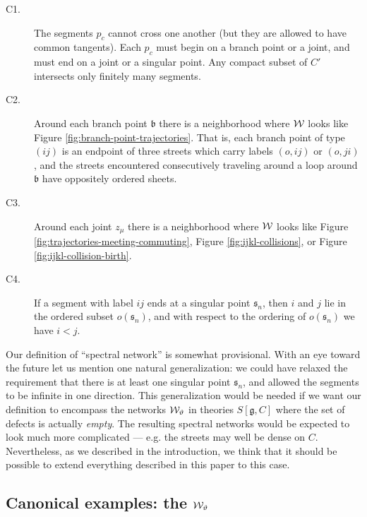 \documentclass[11pt,a4paper]{article}
\def\fg{\mathfrak{g}}
\def\wnet {{\cal W}}
\newcommand{\ti}[1]{\textit{#1}}
\def\fb{\mathfrak{b}}
\def\fg{\mathfrak{g}}
\def\fs{\mathfrak{s}}
\def\wnet {{\cal W}}
\begin{document}
\begin{description}

\item[C1.] The segments $p_c$ cannot cross one another (but they are allowed to
have common tangents).  Each $p_c$ must begin on a branch point or a joint,
and must end on a joint or a singular point.  Any compact subset of $C'$
intersects only finitely many segments.

\item[C2.] Around each branch point $\fb$ there is a neighborhood where $\wnet$
looks like Figure \ref{fig:branch-point-trajectories}.  That is,
each branch point of type $(ij)$ is an endpoint of three
streets which carry labels $(o,ij)$ or $(o,ji)$, and
the streets encountered consecutively traveling around a loop around $\fb$
have oppositely ordered sheets.

\item[C3.] Around each joint $z_\mu$ there is a neighborhood where
$\wnet$ looks like Figure \ref{fig:trajectories-meeting-commuting},
Figure \ref{fig:ijkl-collisions}, or Figure \ref{fig:ijkl-collision-birth}.

\item[C4.] If a segment with label $ij$ ends at a singular point $\mathfrak{s}_n$,
then $i$ and $j$ lie in the ordered subset $o(\mathfrak{s}_n)$,
and with respect to the ordering of $o(\mathfrak{s}_n)$ we have $i < j$.

\end{description}

Our definition of ``spectral network'' is somewhat provisional.
With an eye toward the future let us mention one natural
generalization:  we could have relaxed the requirement that there is at least
one singular point $\fs_n$, and allowed
the segments to be infinite in one direction.  This generalization would be needed
if we want our definition to encompass the networks $\wnet_\vartheta$ in theories $S[\fg, C]$
where the set of defects is actually \ti{empty}.
The resulting spectral networks would be expected to look much more complicated --- e.g.
the streets may well be dense on $C$.  Nevertheless, as we described in the introduction,
we think that it should be possible to extend everything described in this paper to this case.



\subsection{Canonical examples:  the $\wnet_\vartheta$}
\end{document}
